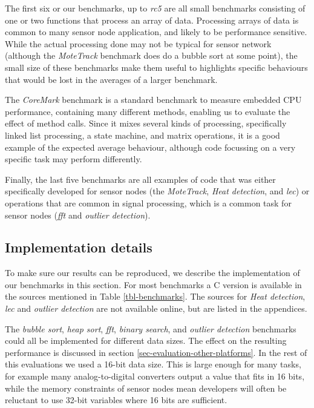 The first six or our benchmarks, up to \emph{rc5} are all small benchmarks consisting of one or two functions that process an array of data. Processing arrays of data is common to many sensor node application, and likely to be performance sensitive. While the actual processing done may not be typical for sensor network (although the \emph{MoteTrack} benchmark does do a bubble sort at some point), the small size of these benchmarks make them useful to highlights specific behaviours that would be lost in the averages of a larger benchmark.

The \emph{CoreMark} benchmark is a standard benchmark to measure embedded CPU performance, containing many different methods, enabling us to evaluate the effect of method calls. Since it mixes several kinds of processing, specifically linked list processing, a state machine, and matrix operations, it is a good example of the expected average behaviour, although code focussing on a very specific task may perform differently.

Finally, the last five benchmarks are all examples of code that was either specifically developed for sensor nodes (the \emph{MoteTrack}, \emph{Heat detection}, and \emph{lec}) or operations that are common in signal processing, which is a common task for sensor nodes (\emph{fft} and \emph{outlier detection}).


\subsection{Implementation details}
To make sure our results can be reproduced, we describe the implementation of our benchmarks in this section. For most benchmarks a C version is available in the sources mentioned in Table \ref{tbl-benchmarks}. The sources for \emph{Heat detection}, \emph{lec} and \emph{outlier detection} are not available online, but are listed in the appendices.

The \emph{bubble sort}, \emph{heap sort}, \emph{fft}, \emph{binary search}, and \emph{outlier detection} benchmarks could all be implemented for different data sizes. The effect on the resulting performance is discussed in section \ref{sec-evaluation-other-platforms}. In the rest of this evaluations we used a 16-bit data size. This is large enough for many tasks, for example many analog-to-digital converters output a value that fits in 16 bits, while the memory constraints of sensor nodes mean developers will often be reluctant to use 32-bit variables where 16 bits are sufficient.

